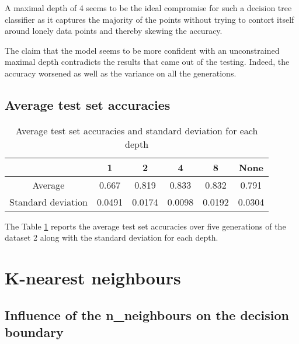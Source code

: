 \documentclass[12pt]{article}
\begin{document}
A maximal depth of 4 seems to be the ideal compromise for such a decision tree classifier as it captures the majority of the points without trying to contort itself around lonely data points and thereby skewing the accuracy.

The claim that the model seems to be more confident with an unconstrained maximal depth contradicts the results that came out of the testing. Indeed, the accuracy worsened as well as the variance on all the generations.

\subsection{Average test set accuracies}

\begin{table}[h!]
    \centering
    \begin{tabular}{|c|c|c|c|c|c|}
  \hline
 & 1 & 2 & 4 & 8 & None \\
  \hline
  Average & 0.667 & 0.819 & 0.833 & 0.832 & 0.791 \\
  \hline
  Standard deviation & 0.0491 & 0.0174 & 0.0098 & 0.0192 & 0.0304 \\
  \hline
\end{tabular}
    \caption{Average test set accuracies and standard deviation for each depth}
    \label{tab:mean_dt}
\end{table}

The Table \ref{tab:mean_dt} reports the average test set accuracies over five generations of the dataset 2 along with the standard deviation for each depth.

\section{K-nearest neighbours}

\subsection{Influence of the n\_neighbours on the decision boundary}
\end{document}

